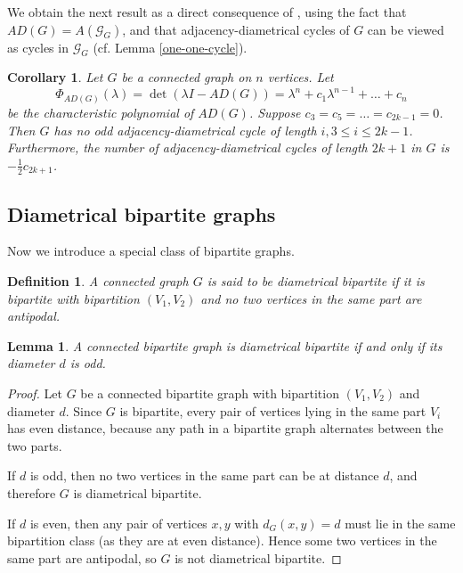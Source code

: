 \documentclass[12pt]{article}
\numberwithin{equation}{section}
\newtheorem{cor}{Corollary}[section]
\newtheorem{defn}{Definition}[section]
\newtheorem{lemma}{Lemma}[section]
\begin{document}
	
	We obtain the next result as a direct consequence of \cite[Corollary 3.11]{bapat2010graphs}, using the fact that $AD(G) =A(\mathcal{G}_G)$, and that adjacency-diametrical cycles of $G$ can be viewed as cycles in $\mathcal{G}_G$ (cf. Lemma \ref{one-one-cycle}). 	
	\begin{cor}\label{cor 5.1}
		Let $G$ be a connected graph on $n$ vertices. Let
		\begin{equation*}
			\Phi_{AD(G)}(\lambda)=\det(\lambda I-AD(G))=\lambda^{n}+c_{1}\lambda^{n-1}+\dots+c_n
		\end{equation*}
		be the characteristic polynomial of $AD(G)$. Suppose $c_{3}=c_{5}=\dots=c_{2k-1}=0$. Then $G$ has no odd adjacency-diametrical cycle of length $i, 3\leq i \leq 2k-1$. Furthermore, the number of adjacency-diametrical  cycles of length $2k+1$ in $G$ is $-\frac{1}{2} c_{2k+1}$. 
	\end{cor}
	
\subsection{Diametrical bipartite graphs}
	Now we introduce a  special class of bipartite graphs.
	\begin{defn}\normalfont
		A connected graph $G$ is said to be \textit{diametrical bipartite} if it is bipartite with bipartition $(V_1, V_2)$ and no two vertices in the same part are antipodal.
	\end{defn}
	
	\begin{lemma}\label{odddiam}
		A connected bipartite graph is diametrical bipartite if and only if its diameter $d$ is odd.
	\end{lemma}
	
	\begin{proof}
		Let $G$ be a connected bipartite graph with bipartition $(V_1, V_2)$ and diameter $d$.
		Since $G$ is bipartite, every pair of vertices lying in the same part $V_i$ has even distance, because any path in a bipartite graph alternates between the two parts.
		
		If $d$ is odd, then no two vertices in the same part can be at distance $d$, and therefore $G$ is diametrical bipartite.
		
		If $d$ is even, then any pair of vertices $x,y$ with $d_G(x,y)=d$ must lie in the same bipartition class (as they are at even distance). Hence some two vertices in the same part are antipodal, so $G$ is not diametrical bipartite.
	\end{proof}
	
\end{document}
